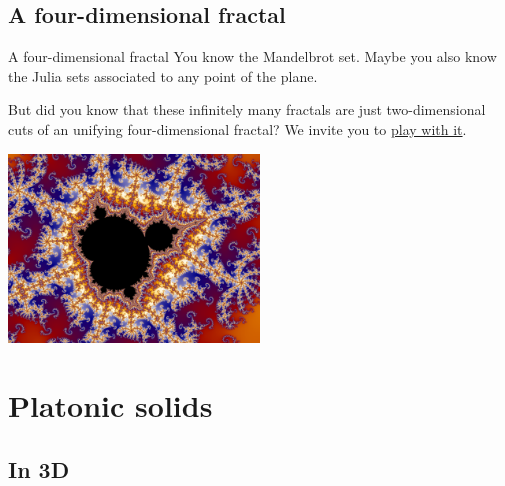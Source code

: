 \documentclass[12pt,compress,ngerman,utf8,t]{beamer}
\newcommand{\hil}[1]{{\usebeamercolor[fg]{item}{\textbf{#1}}}}
\begin{document}


\subsection{A four-dimensional fractal}

\begin{frame}{A four-dimensional fractal}
  You know the Mandelbrot set.
  Maybe you also know the Julia sets associated to any point of the plane.
  \bigskip

  But did you know that these infinitely many fractals are just two-dimensional
  cuts of an unifying four-dimensional fractal?
  We invite you to
  \href{http://rawgit.com/MatthiasHu/FractalsWebGL/4d/page.html}{play with it}.
  \bigskip

  \centering
  \includegraphics[width=0.5\textwidth]{mandelbrot}
  \par
\end{frame}


\section{Platonic solids}

\newcommand{\solid}[4]{\begin{column}{0.31\textwidth}\centering\hil{#2}\par#3 faces, #4 vertices\\\medskip\texttt{[image: \#1]}\end{column}}
\newcommand{\solidd}[3]{\begin{column}{0.35\textwidth}\centering\hil{#2}\par#3\\\medskip\texttt{[image: \#1]}\end{column}}


\subsection{In 3D}
\end{document}
